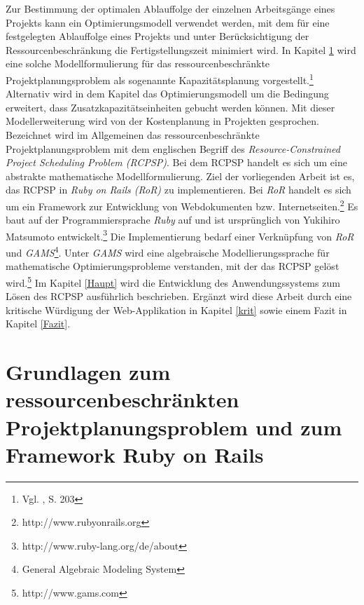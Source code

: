 \documentclass[a4paper,12pt,parskip,bibtotoc,liststotoc]{article}
\begin{document}
Zur Bestimmung der optimalen Ablauffolge der einzelnen Arbeitsgänge eines Projekts kann ein Optimierungsmodell verwendet werden, mit dem für eine festgelegten Ablauffolge eines Projekts und unter Berücksichtigung der Ressourcenbeschränkung die Fertigstellungszeit minimiert wird. In Kapitel \ref{Grund} wird eine solche Modellformulierung für das ressourcenbeschränkte Projektplanungsproblem als sogenannte Kapazitätsplanung vorgestellt.\footnote{Vgl. \cite{Helber}, S. 203} Alternativ wird in dem Kapitel das Optimierungsmodell um die Bedingung erweitert, dass  Zusatzkapazitätseinheiten gebucht werden können. Mit dieser Modellerweiterung wird von der Kostenplanung in Projekten gesprochen. Bezeichnet wird im Allgemeinen das ressourcenbeschränkte Projektplanungsproblem mit dem englischen Begriff des \textit{Resource-Con\-strained Project Scheduling Problem (RCPSP)}. Bei dem RCPSP handelt es sich um eine abstrakte mathematische Modellformulierung. Ziel der vorliegenden Arbeit ist es, das RCPSP in \textit{Ruby on Rails (RoR)} zu implementieren. Bei \textit{RoR} handelt es sich um ein Framework zur Entwicklung von Webdokumenten bzw. Internetseiten.\footnote{http://www.rubyonrails.org} Es baut auf der Programmiersprache \textit{Ruby} auf und ist ursprünglich von Yukihiro Matsumoto entwickelt.\footnote{http://www.ruby-lang.org/de/about} Die Implementierung bedarf einer Verknüpfung von \textit{RoR} und \textit{GAMS}\footnote{General Algebraic Modeling System}. Unter \textit{GAMS} wird eine algebraische Modellierungssprache für mathematische Optimierungsprobleme verstanden, mit der das RCPSP gelöst wird.\footnote{http://www.gams.com} Im Kapitel \ref{Haupt} wird die Entwicklung des Anwendungssystems zum Lösen des RCPSP ausführlich beschrieben. Ergänzt wird diese Arbeit durch eine kritische Würdigung der Web-Applikation in Kapitel \ref{krit} sowie einem Fazit in Kapitel \ref{Fazit}.

\section{Grundlagen zum ressourcenbeschränkten Projektplanungsproblem und zum Framework Ruby on Rails} \label{Grund}
\end{document}
